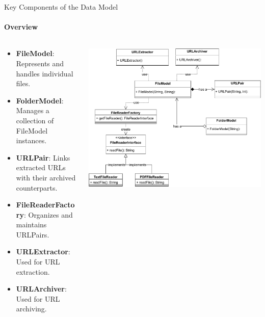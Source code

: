 \documentclass[
    ngerman,%
    authorontitle=true,
]{bfhbeamer}
\begin{document}
    \begin{frame}{Key Components of the Data Model}
        \framesubtitle{Overview}
        \begin{columns} %
            \begin{column}{0.5\textwidth} %
                \begin{itemize}
                    \item \textbf{FileModel}: Represents and handles individual files.
                    \item \textbf{FolderModel}: Manages a collection of FileModel instances.
                    \item \textbf{URLPair}: Links extracted URLs with their archived counterparts.
                    \item \textbf{FileReaderFactory}: Organizes and maintains URLPairs.
                    \item \textbf{URLExtractor}: Used for URL extraction.
                    \item \textbf{URLArchiver}: Used for URL archiving.
                \end{itemize}
            \end{column}
            \begin{column}{0.5\textwidth} %
                \includegraphics[width=1\textwidth]{pictures/URL_Archiver_Class_Diagram-DataModel}
            \end{column}

\end{columns}
\end{frame}
\end{document}
